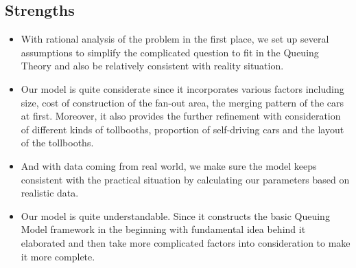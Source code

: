 \subsection{Strengths}
\begin{itemize}
\item With rational analysis of the problem in the first place, we set up several assumptions to simplify the complicated question to fit in the Queuing Theory and also be relatively consistent with reality situation.
\item Our model is quite considerate since it incorporates various factors including size, cost of construction of the fan-out area, the merging pattern of the cars at first. Moreover, it also provides the further refinement with consideration of different kinds of tollbooths, proportion of self-driving cars and the layout of the tollbooths.
\item And with data coming from real world, we make sure the model keeps consistent with the practical situation by calculating our parameters based on realistic data.
\item Our model is quite understandable. Since it constructs the basic Queuing Model framework in the beginning with fundamental idea behind it elaborated and then take more complicated factors into consideration to make it more complete.
\end{itemize}

